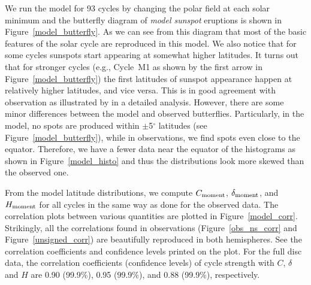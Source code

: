 \documentclass[preprint2,times,tighten]{aastex61}
\newcommand{\Fig}[1]{Figure~\ref{#1}}
\begin{document}
We run the model for 93 cycles by changing the polar field at each solar minimum
and the butterfly diagram of {\it model sunspot} eruptions is shown in \Fig{model_butterfly}. 
As we can see from this diagram that most of the basic features of the solar cycle are reproduced in this model.
We also notice that for some cycles sunspots start appearing at somewhat higher latitudes. 
It turns out that for stronger cycles (e.g., Cycle~M1 as shown by the first arrow in \Fig{model_butterfly}) 
the first latitudes of sunspot appearance happen at relatively higher latitudes, and vice versa. 
This is in good agreement with observation as illustrated by \citet{2017A&A...599A.131L} in a detailed analysis.
However, there are some minor differences between the model and observed butterflies. 
Particularly, in the model, no spots are produced within $\pm$5$^\circ$ latitudes 
(see \Fig{model_butterfly}), while in observations, we find spots even close to the equator. 
Therefore, we have a fewer data near the equator of the histograms as shown in \Fig{model_histo} 
and thus the distributions look more skewed than the observed one.

From the model latitude distributions, we compute $C_{\rm{ moment}}$, $\delta_{\rm{ moment}}$, and $H_{\rm{ moment}}$
for all cycles in the same way as done for the observed data. 
The correlation plots between various quantities are plotted in \Fig{model_corr}. 
Strikingly, all the correlations found in observations (\Fig{obs_ns_corr} and \Fig{unsigned_corr}) are beautifully reproduced in both hemispheres.
See the correlation coefficients and confidence levels printed on the plot.
For the full disc data, the correlation coefficients (confidence levels) 
of cycle strength with $C$, $\delta$ and $H$ are 0.90 (99.9\%), 0.95 (99.9\%), and 0.88 (99.9\%), respectively.
\end{document}
